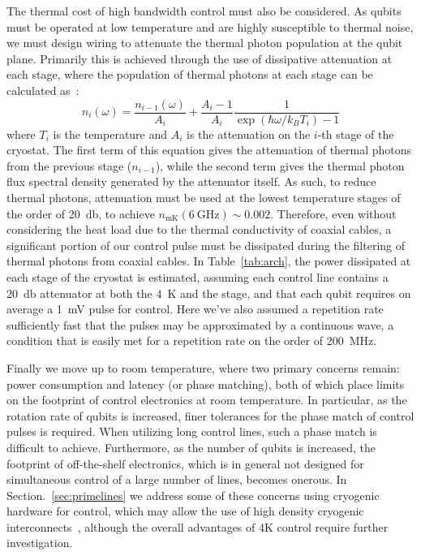 The thermal cost of high bandwidth control must also be considered. As qubits must be operated at low
temperature and are highly susceptible to thermal noise, we must design wiring to attenuate the thermal photon population at the qubit plane. Primarily this is achieved
through the use of dissipative attenuation at each stage, where the population of thermal photons at each stage can be calculated as~\cite{Krinner2019}:
\begin{equation}
  n_i(\omega) = \frac{n_{i-1}(\omega)}{A_i} + \frac{A_i - 1}{A_i}\frac{1}{\exp(\hbar\omega/k_BT_i) - 1}
  \label{eq:phot}
\end{equation}
where $T_i$ is the temperature and $A_i$ is the attenuation on the $i$-th stage of the cryostat. The first term of this equation gives the attenuation of thermal photons
from the previous stage ($n_{i-1}$), while the second term gives the thermal photon flux spectral density generated by the attenuator itself. As such, to reduce thermal photons,
attenuation must be used at the lowest temperature stages of the order of \SI{20}{\decibel}, to achieve $n_\textrm{mK}(\SI{6}{\giga\hertz}) \sim 0.002$. Therefore,
even without considering the heat load due to the thermal conductivity of coaxial cables, a significant portion of our control pulse must be dissipated during the
filtering of thermal photons from coaxial cables. In Table~\ref{tab:arch}, the power dissipated at each stage of the cryostat is estimated, assuming each control line contains
a \SI{20}{\decibel} attenuator at both the \SI{4}{\kelvin} and the \si{\mk} stage, and that each qubit requires on average a \SI{1}{\milli\volt} pulse for control. Here we've also
assumed a repetition rate sufficiently fast that the pulses may be approximated by a continuous wave, a condition that is easily met for a repetition rate on the order of
\SI{200}{\mega\hertz}.

Finally we move up to room temperature, where two primary concerns remain: power consumption and latency (or phase matching), both of which place limits on the footprint
of control electronics at room temperature. In particular, as the rotation rate of qubits is increased, finer tolerances for the phase match of control pulses
is required. When utilizing long control lines, such a phase match is difficult to achieve. Furthermore, as the number of qubits is increased, the footprint of
off-the-shelf electronics, which is in general not designed for simultaneous control of a large number of lines, becomes onerous. In Section.~\ref{sec:primelines}
we address some of these concerns using cryogenic hardware for control, which may allow the use of high density cryogenic interconnects~\cite{Tuckerman_2016}, although
the overall advantages of 4K control require further investigation.

